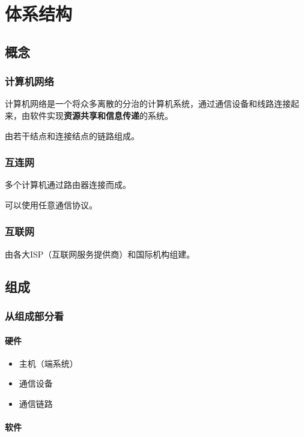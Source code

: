 
\chapter{体系结构}

\section{概念}

\subsection{计算机网络}
计算机网络是一个将众多离散的分治的计算机系统，通过通信设备和线路连接起来，由软件实现\textbf{资源共享和信息传递}的系统。

由若干结点和连接结点的链路组成。


\subsection{互连网}
多个计算机通过路由器连接而成。

可以使用任意通信协议。


\subsection{互联网}
由各大ISP（互联网服务提供商）和国际机构组建。


\section{组成}

\subsection{从组成部分看}

\subsubsection{硬件}
\begin{itemize}
    \item 主机（端系统）
    \item 通信设备
    \item 通信链路
\end{itemize}


\subsubsection{软件}


